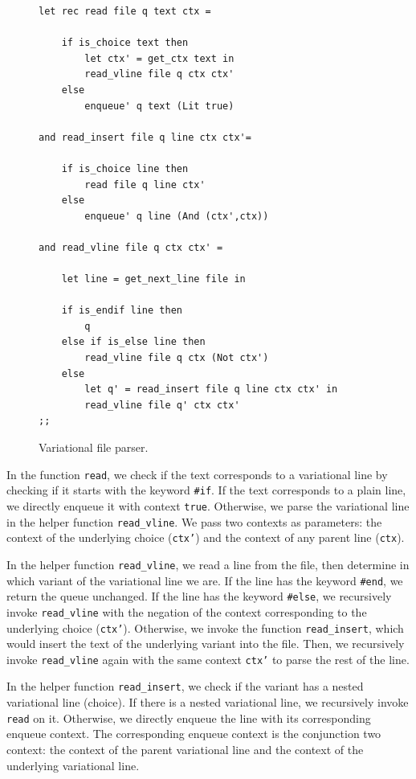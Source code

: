 %
\begin{figure}[h]
 \begin{lstlisting}
let rec read file q text ctx =

    if is_choice text then
        let ctx' = get_ctx text in 
        read_vline file q ctx ctx'
    else  
        enqueue' q text (Lit true)
        
and read_insert file q line ctx ctx'= 

    if is_choice line then 
        read file q line ctx'
    else 
        enqueue' q line (And (ctx',ctx)) 
				 
and read_vline file q ctx ctx' = 

    let line = get_next_line file in 
	
    if is_endif line then 
        q
    else if is_else line then 
        read_vline file q ctx (Not ctx')
    else
        let q' = read_insert file q line ctx ctx' in
        read_vline file q' ctx ctx'
;;
\end{lstlisting}
  \caption{Variational file parser.}
  \label{fig:parser}
\end{figure}

In the function \texttt{read}, we check if the text corresponds to a variational line by checking if it starts with the keyword \texttt{\#if}. If the text corresponds to a plain line, we directly enqueue it with context \texttt{true}. Otherwise, we parse the variational line in the helper function \texttt{read\_vline}. We pass two contexts as parameters: the context of the underlying choice (\texttt{ctx'}) and the context of any parent line (\texttt{ctx}).

In the helper function \texttt{read\_vline}, we read a line from the file, then determine in which variant of the variational line we are. If the line has the keyword \texttt{\#end}, we return the queue unchanged. If the line has the keyword \texttt{\#else}, we recursively invoke \texttt{read\_vline} with the negation of the context corresponding to the underlying choice (\texttt{ctx'}). Otherwise, we invoke the function \texttt{read\_insert}, which would insert the text of the underlying variant into the file. Then, we recursively invoke \texttt{read\_vline} again with the same context \texttt{ctx'} to parse the rest of the line. 

In the helper function \texttt{read\_insert}, we check if the variant has a nested variational line (choice). If there is a nested variational line, we recursively invoke \texttt{read} on it. Otherwise, we directly enqueue the line with its corresponding enqueue context. The corresponding enqueue context is the conjunction two context: the context of the parent variational line and the context of the underlying variational line. 


